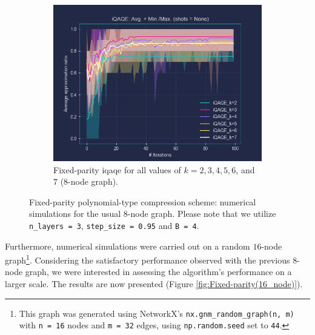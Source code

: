 \clearpage

\begin{figure}[ht!]
  \addtocounter{figure}{-1} %
  \centering
  \begin{subfigure}[b]{1\textwidth}
      \addtocounter{subfigure}{2} %
      \centering
      \includegraphics[width=1\textwidth]{Figures/Chapter_5/Fixed-parity/All_k's(8-node).png}
      \caption{Fixed-parity \acrshort{iqaqe} for all values of $k = 2, 3, 4, 5, 6$, and $7$ ($8$-node graph).}
      \label{fig:Fixed-parity/All_k's}
  \end{subfigure}
  \caption{Fixed-parity polynomial-type compression scheme: numerical simulations for the usual $8$-node graph. Please note that we utilize \texttt{n\_layers = 3}, \texttt{step\_size = 0.95} and \texttt{B = 4}.}
  \label{fig:Fixed-parity}
\end{figure}

Furthermore, numerical simulations were carried out on a random $16$-node graph\footnote{This graph was generated using NetworkX's \texttt{nx.gnm\_random\_graph(n, m)} with \texttt{n = 16} nodes and \texttt{m = 32} edges, using \texttt{np.random.seed} set to \texttt{44}.}. Considering the satisfactory performance observed with the previous $8$-node graph, we were interested in assessing the algorithm's performance on a larger scale. The results are now presented (Figure \ref{fig:Fixed-parity(16_node)}).

